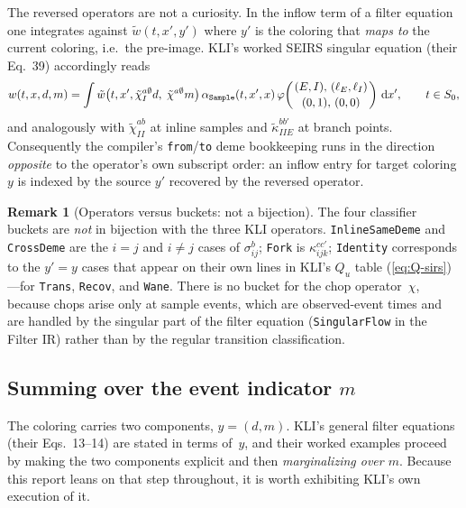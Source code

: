 \documentclass[11pt,leqno]{article}
\newcommand{\dd}[1]{\,\mathrm{d}{#1}}
\newcommand{\binratio}[4]{\varphi\!\left(\genfrac{}{}{0pt}{}{#1,\,#2}{#3,\,#4}\right)}
\newcommand{\code}[1]{\texttt{#1}}
\theoremstyle{plain}
\theoremstyle{definition}
\newtheorem{remark}[theorem]{Remark}
\begin{document}
The reversed operators are not a curiosity.  In the inflow term of a
filter equation one integrates against $\tilde{w}(t, x', y')$ where
$y'$ is the coloring that \emph{maps to} the current coloring, i.e.\
the pre-image.  KLI's worked SEIRS singular equation (their Eq.~39)
accordingly reads
\[
  w(t,x,d,m) = \int \tilde{w}\bigl(t, x',
    \tilde{\chi}^{a\emptyset}_{I} d,\;
    \tilde{\chi}^{a\emptyset} m\bigr)\,
    \alpha_{\code{Sample}}(t,x',x)\,
    \binratio{(E,I)}{(\ell_E,\ell_I)}{(0,1)}{(0,0)} \dd{x'},
  \qquad t \in S_0,
\]
and analogously with $\tilde{\chi}^{ab}_{II}$ at inline samples and
$\tilde{\kappa}^{bb'}_{IIE}$ at branch points.  Consequently the
compiler's \code{from}/\code{to} deme bookkeeping runs in the direction
\emph{opposite} to the operator's own subscript order: an inflow entry
for target coloring $y$ is indexed by the source $y'$ recovered by the
reversed operator.

\begin{remark}[Operators versus buckets: not a bijection]
The four classifier buckets are \emph{not} in bijection with the three
KLI operators.  \code{InlineSameDeme} and \code{CrossDeme} are the
$i = j$ and $i \ne j$ cases of $\sigma^{b}_{ij}$; \code{Fork} is
$\kappa^{cc'}_{ijk}$; \code{Identity} corresponds to the $y' = y$ cases
that appear on their own lines in KLI's $Q_u$ table
(\ref{eq:Q-sirs})---for \code{Trans}, \code{Recov}, and \code{Wane}.
There is no bucket for the chop operator~$\chi$, because chops arise
only at sample events, which are observed-event times and are handled
by the singular part of the filter equation
(\code{SingularFlow} in the Filter IR) rather than by the regular
transition classification.
\end{remark}

\subsection{Summing over the event indicator $m$}
\label{sec:m-sum}

The coloring carries two components, $y = (d, m)$.  KLI's general
filter equations (their Eqs.~13--14) are stated in terms of~$y$, and
their worked examples proceed by making the two components explicit and
then \emph{marginalizing over $m$}.  Because this report leans on that
step throughout, it is worth exhibiting KLI's own execution of it.
\end{document}
